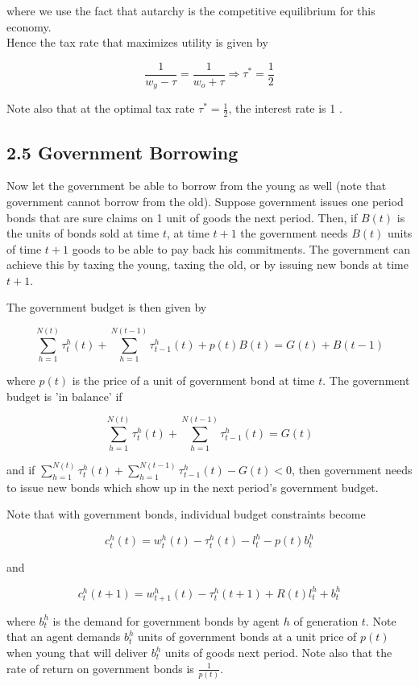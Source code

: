 \documentclass[10pt]{article}
\begin{document}
where we use the fact that autarchy is the competitive equilibrium for this economy.\\
Hence the tax rate that maximizes utility is given by

$$
\frac{1}{w_{y}-\tau}=\frac{1}{w_{o}+\tau} \Rightarrow \tau^{*}=\frac{1}{2}
$$

Note also that at the optimal tax rate $\tau^{*}=\frac{1}{2}$, the interest rate is 1 .

\subsection*{2.5 Government Borrowing}
Now let the government be able to borrow from the young as well (note that government cannot borrow from the old). Suppose government issues one period bonds that are sure claims on 1 unit of goods the next period. Then, if $B(t)$ is the units of bonds sold at time $t$, at time $t+1$ the government needs $B(t)$ units of time $t+1$ goods to be able to pay back his commitments. The government can achieve this by taxing the young, taxing the old, or by issuing new bonds at time $t+1$.

The government budget is then given by

$$
\sum_{h=1}^{N(t)} \tau_{t}^{h}(t)+\sum_{h=1}^{N(t-1)} \tau_{t-1}^{h}(t)+p(t) B(t)=G(t)+B(t-1)
$$

where $p(t)$ is the price of a unit of government bond at time $t$. The government budget is 'in balance' if

$$
\sum_{h=1}^{N(t)} \tau_{t}^{h}(t)+\sum_{h=1}^{N(t-1)} \tau_{t-1}^{h}(t)=G(t)
$$

and if $\sum_{h=1}^{N(t)} \tau_{t}^{h}(t)+\sum_{h=1}^{N(t-1)} \tau_{t-1}^{h}(t)-G(t)<0$, then government needs to issue new bonds which show up in the next period's government budget.

Note that with government bonds, individual budget constraints become

$$
c_{t}^{h}(t)=w_{t}^{h}(t)-\tau_{t}^{h}(t)-l_{t}^{h}-p(t) b_{t}^{h}
$$

and

$$
c_{t}^{h}(t+1)=w_{t+1}^{h}(t)-\tau_{t}^{h}(t+1)+R(t) l_{t}^{h}+b_{t}^{h}
$$

where $b_{t}^{h}$ is the demand for government bonds by agent $h$ of generation $t$. Note that an agent demands $b_{t}^{h}$ units of government bonds at a unit price of $p(t)$ when young that will deliver $b_{t}^{h}$ units of goods next period. Note also that the rate of return on government bonds is $\frac{1}{p(t)}$.
\end{document}
